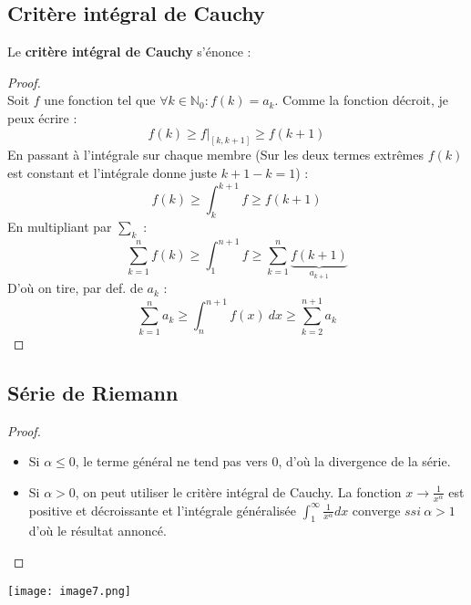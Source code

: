 \documentclass[11pt, a4paper, openany]{book}
\begin{document}
\subsection{Critère intégral de Cauchy}
Le \textbf{critère intégral de Cauchy} s'énonce :\\
		
			
\begin{proof}
	\ \\
	Soit $f$ une fonction tel que $\forall k \in \mathbb{N}_0 : f(k) = a_k$. Comme la fonction décroit, je peux  écrire :
	\begin{equation}
		f(k) \geq f|_{[k, k+1]} \geq f(k+1)
	\end{equation}
	En passant à l'intégrale sur chaque membre (Sur les deux termes extrêmes $f(k)$ est constant et l'intégrale donne juste $k+1-k = 1$) :
	\begin{equation}
		f(k) \geq \int_k^{k+1} f \geq f(k+1)
	\end{equation}
	En multipliant par $\sum_k$ :
	\begin{equation}
		\sum_{k=1}^n f(k) \geq \int_1^{n+1} f \geq \sum_{k=1}^n \underbrace{f(k+1)}_{a_{k+1}}
	\end{equation}
	D'où on tire, par def. de $a_k$ :
	\begin{equation}
		\sum_{k=1}^n a_k \geq \int_n^{n+1} f(x)\ dx \geq \sum_{k=2}^{n+1} a_k
	\end{equation}
\end{proof}
			
\setcounter{subsection}{4}
\subsection{Série de Riemann}
\begin{proof}\ \\
	\begin{itemize}
		\item Si $\alpha \leq 0$, le terme général ne tend pas vers 0, d'où la divergence de la série.
		\item Si $\alpha > 0$, on peut utiliser le critère intégral de Cauchy. La fonction $x \rightarrow \frac{1}{x^\alpha}$  est positive et décroissante et l'intégrale généralisée $\int_1^\infty \frac{1}{x^\alpha}dx$ converge $ssi\ \alpha > 1$ d'où le résultat annoncé.
	\end{itemize}
\end{proof}
\begin{center}
	\texttt{[image: image7.png]}
\end{center}
			
\end{document}
